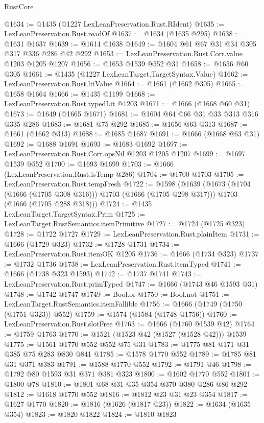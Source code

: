 \begin{lexlean}{RustCore}
\begin{coremodule}
@1634 := @1435 (@1227 LexLeanPreservation.Rust.RIdent)
@1635 := LexLeanPreservation.Rust.readOf
@1637 := @1634 (@1635 @295)
@1638 := @1631 @1637
@1639 := @1614 @1638
@1649 := @1604 @61 @67 @31 @34 @305 @317 @336 @286 @42 @292
@1653 := LexLeanPreservation.Rust.Corr.value @1203 @1205 @1207
@1656 := @1653 @1539 @552 @31
@1658 := @1656 @60 @305
@1661 := @1435 (@1227 LexLeanTarget.TargetSyntax.Value)
@1662 := LexLeanPreservation.Rust.litValue
@1664 := @1661 (@1662 @305)
@1665 := @1658 @1664
@1666 := @1435 @1199
@1668 := LexLeanPreservation.Rust.typedLit @1203
@1671 := @1666 (@1668 @60 @31)
@1673 := @1649 (@1665 @1671)
@1681 := @1604 @64 @66 @31 @33 @313 @316 @335 @286
@1683 := @1681 @75 @292
@1685 := @1656 @63 @313
@1687 := @1661 (@1662 @313)
@1688 := @1685 @1687
@1691 := @1666 (@1668 @63 @31)
@1692 := @1688 @1691
@1693 := @1683 @1692
@1697 := LexLeanPreservation.Rust.Corr.opsNil @1203 @1205 @1207
@1699 := @1697 @1539 @552
@1700 := @1693 @1699
@1703 := @1666 (LexLeanPreservation.Rust.isTemp @286)
@1704 := @1700 @1703
@1705 := LexLeanPreservation.Rust.tempFresh
@1722 := @1598
    (@1639
      (@1673 (@1704 (@1666 (@1705 @308 @316))) @1703 (@1666 (@1705 @298 @317)))
      @1703
      (@1666 (@1705 @288 @318)))
@1724 := @1435 LexLeanTarget.TargetSyntax.Prim
@1725 := LexLeanTarget.RustSemantics.itemPrimitive
@1727 := @1724 (@1725 @323)
@1728 := @1722 @1727
@1729 := LexLeanPreservation.Rust.plainItem
@1731 := @1666 (@1729 @323)
@1732 := @1728 @1731
@1734 := LexLeanPreservation.Rust.itemOK @1205
@1736 := @1666 (@1734 @323)
@1737 := @1732 @1736
@1738 := LexLeanPreservation.Rust.itemTyped
@1741 := @1666 (@1738 @323 @1593)
@1742 := @1737 @1741
@1743 := LexLeanPreservation.Rust.primTyped
@1747 := @1666 (@1743 @46 @1593 @31)
@1748 := @1742 @1747
@1749 := Bool.or
@1750 := Bool.not
@1751 := LexLeanTarget.RustSemantics.itemFallible
@1756 := @1666 (@1749 (@1750 (@1751 @323)) @552)
@1759 := @1574 (@1584 (@1748 @1756))
@1760 := LexLeanPreservation.Rust.slotFree
@1763 := @1666 (@1760 @1539 @42)
@1764 := @1759 @1763
@1770 := @1521 (@1523 @42 (@1527 (@1528 @42))) @1539
@1775 := @1561 @1770 @552 @552 @75 @31
@1783 := @1775 @81 @171 @31 @385 @75 @283 @830 @841
@1785 := @1578 @1770 @552
@1789 := @1785 @81 @31 @371 @383
@1791 := @1588 @1770 @552
@1792 := @1791 @46
@1798 := @1792 @80 @1593 @31 @371 @381 @323
@1800 := @1602 @1770 @552
@1801 := @1800 @78
@1810 := @1801 @68 @31 @35 @354 @370 @380 @286 @86 @292
@1812 := @1618 @1770 @552
@1816 := @1812 @23 @31 @23 @354
@1817 := @1627 @1770
@1820 := @1816 (@1626 (@1817 @23))
@1822 := @1634 (@1635 @354)
@1823 := @1820 @1822
@1824 := @1810 @1823

\end{coremodule}
\end{lexlean}
